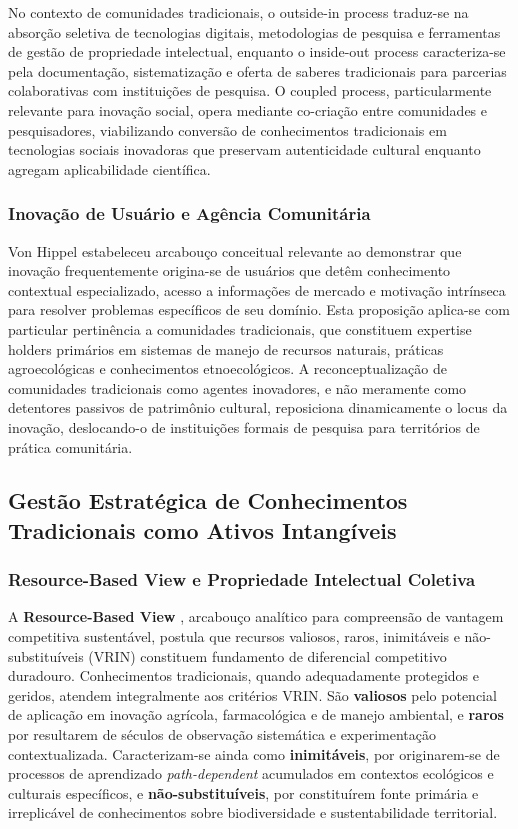 No contexto de comunidades tradicionais, o outside-in process traduz-se na absorção seletiva de tecnologias digitais, metodologias de pesquisa e ferramentas de gestão de propriedade intelectual, enquanto o inside-out process caracteriza-se pela documentação, sistematização e oferta de saberes tradicionais para parcerias colaborativas com instituições de pesquisa. O coupled process, particularmente relevante para inovação social, opera mediante co-criação entre comunidades e pesquisadores, viabilizando conversão de conhecimentos tradicionais em tecnologias sociais inovadoras que preservam autenticidade cultural enquanto agregam aplicabilidade científica.

\subsubsection{Inovação de Usuário e Agência Comunitária}

Von Hippel \cite{vonHippel1988} estabeleceu arcabouço conceitual relevante ao demonstrar que inovação frequentemente origina-se de usuários que detêm conhecimento contextual especializado, acesso a informações de mercado e motivação intrínseca para resolver problemas específicos de seu domínio. Esta proposição aplica-se com particular pertinência a comunidades tradicionais, que constituem expertise holders primários em sistemas de manejo de recursos naturais, práticas agroecológicas e conhecimentos etnoecológicos. A reconceptualização de comunidades tradicionais como agentes inovadores, e não meramente como detentores passivos de patrimônio cultural, reposiciona dinamicamente o locus da inovação, deslocando-o de instituições formais de pesquisa para territórios de prática comunitária.

\subsection{Gestão Estratégica de Conhecimentos Tradicionais como Ativos Intangíveis}

\subsubsection{Resource-Based View e Propriedade Intelectual Coletiva}

A \textbf{Resource-Based View} \cite{Barney1991}, arcabouço analítico para compreensão de vantagem competitiva sustentável, postula que recursos valiosos, raros, inimitáveis e não-substituíveis (VRIN) constituem fundamento de diferencial competitivo duradouro. Conhecimentos tradicionais, quando adequadamente protegidos e geridos, atendem integralmente aos critérios VRIN. São \textbf{valiosos} pelo potencial de aplicação em inovação agrícola, farmacológica e de manejo ambiental, e \textbf{raros} por resultarem de séculos de observação sistemática e experimentação contextualizada. Caracterizam-se ainda como \textbf{inimitáveis}, por originarem-se de processos de aprendizado \textit{path-dependent} acumulados em contextos ecológicos e culturais específicos, e \textbf{não-substituíveis}, por constituírem fonte primária e irreplicável de conhecimentos sobre biodiversidade e sustentabilidade territorial.


